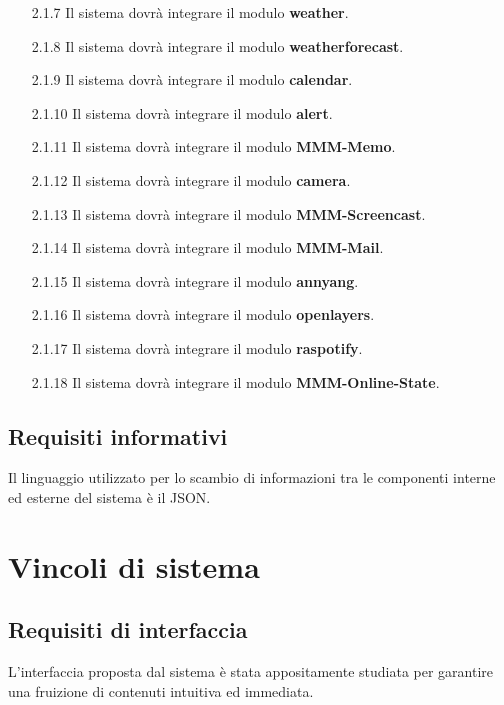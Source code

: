 \documentclass[a4paper,11pt]{article}       %
\begin{document}
\begin{itemize}
            \item[2.1.7] Il sistema dovrà integrare il modulo \textbf{weather}.
            \item[2.1.8] Il sistema dovrà integrare il modulo \textbf{weatherforecast}.
            \item[2.1.9] Il sistema dovrà integrare il modulo \textbf{calendar}.
            \item[2.1.10] Il sistema dovrà integrare il modulo \textbf{alert}.
            \item[2.1.11] Il sistema dovrà integrare il modulo \textbf{MMM-Memo}.
            \item[2.1.12] Il sistema dovrà integrare il modulo \textbf{camera}.
            \item[2.1.13] Il sistema dovrà integrare il modulo \textbf{MMM-Screencast}.
            \item[2.1.14] Il sistema dovrà integrare il modulo \textbf{MMM-Mail}.
            \item[2.1.15] Il sistema dovrà integrare il modulo \textbf{annyang}.
            \item[2.1.16] Il sistema dovrà integrare il modulo \textbf{openlayers}.
            \item[2.1.17] Il sistema dovrà integrare il modulo \textbf{raspotify}.
            \item[2.1.18] Il sistema dovrà integrare il modulo \textbf{MMM-Online-State}.
        \end{itemize}
        
    \subsection{Requisiti informativi}
        Il linguaggio utilizzato per lo scambio di informazioni tra le componenti interne ed esterne del sistema è il JSON.

\newpage

\section{Vincoli di sistema}
    
    \subsection{Requisiti di interfaccia}
        L'interfaccia proposta dal sistema è stata appositamente studiata per garantire una fruizione di contenuti intuitiva ed immediata.
        
\end{document}
